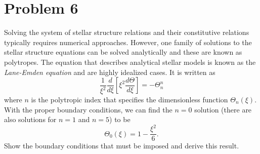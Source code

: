 \documentclass[12pt]{article}
\begin{document}
\section*{Problem 6}
Solving the system of stellar structure relations and their constitutive relations typically requires numerical approaches. However, one family of solutions to the stellar structure equations can be solved analytically and these are known as polytropes. The equation that describes analytical stellar models is known as the \textit{Lane-Emden equation} and are highly idealized cases. It is written as
\begin{equation}
\frac{1}{\xi^2}\frac{d}{d\xi}\left[\xi^2 \frac{d\Theta}{d\xi}\right] = -\Theta_n^n
\end{equation}
where $n$ is the polytropic index that specifies the dimensionless function $\Theta_n (\xi)$. With the proper boundary conditions, we can find the $n=0$ solution (there are also solutions for $n=1$ and $n=5$) to be
\begin{equation}
\Theta_0(\xi) = 1-\frac{\xi^2}{6}.
\end{equation}
Show the boundary conditions that must be imposed and derive this result.
\end{document}
